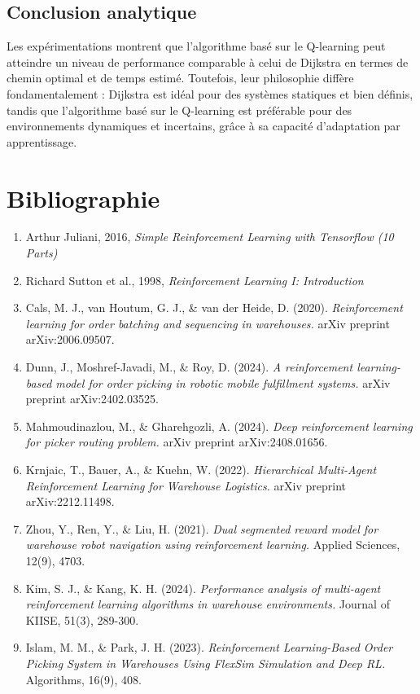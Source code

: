 \documentclass{article}
\begin{document}
\subsection{Conclusion  analytique}
Les expérimentations montrent que l'algorithme basé sur le Q-learning peut atteindre un niveau de performance comparable à celui de Dijkstra en termes de chemin optimal et de temps estimé. Toutefois, leur philosophie diffère fondamentalement : Dijkstra est idéal pour des systèmes statiques et bien définis, tandis que l'algorithme basé sur le Q-learning est préférable pour des environnements dynamiques et incertains, grâce à sa capacité d'adaptation par apprentissage.

\section*{Bibliographie}
\begin{enumerate}
    \item Arthur Juliani, 2016, \textit{Simple Reinforcement Learning with Tensorflow (10 Parts)}
    \item Richard Sutton et al., 1998, \textit{Reinforcement Learning I: Introduction}
    \item Cals, M. J., van Houtum, G. J., \& van der Heide, D. (2020). \textit{Reinforcement learning for order batching and sequencing in warehouses.} arXiv preprint arXiv:2006.09507.
    \item Dunn, J., Moshref-Javadi, M., \& Roy, D. (2024). \textit{A reinforcement learning-based model for order picking in robotic mobile fulfillment systems.} arXiv preprint arXiv:2402.03525.
    \item Mahmoudinazlou, M., \& Gharehgozli, A. (2024). \textit{Deep reinforcement learning for picker routing problem.} arXiv preprint arXiv:2408.01656.
    \item Krnjaic, T., Bauer, A., \& Kuehn, W. (2022). \textit{Hierarchical Multi-Agent Reinforcement Learning for Warehouse Logistics.} arXiv preprint arXiv:2212.11498.
    \item Zhou, Y., Ren, Y., \& Liu, H. (2021). \textit{Dual segmented reward model for warehouse robot navigation using reinforcement learning.} Applied Sciences, 12(9), 4703.
    \item Kim, S. J., \& Kang, K. H. (2024). \textit{Performance analysis of multi-agent reinforcement learning algorithms in warehouse environments.} Journal of KIISE, 51(3), 289-300.
    \item Islam, M. M., \& Park, J. H. (2023). \textit{Reinforcement Learning-Based Order Picking System in Warehouses Using FlexSim Simulation and Deep RL.} Algorithms, 16(9), 408.
\end{enumerate}
\end{document}
